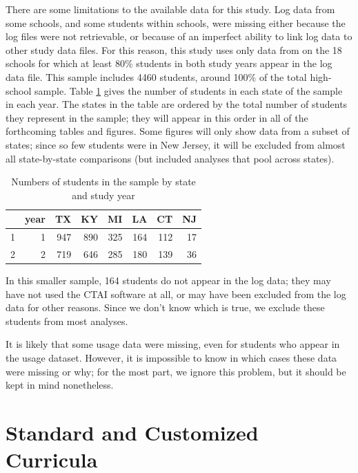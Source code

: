 \documentclass[12pt]{article}\usepackage[]{graphicx}\usepackage[]{color}
\begin{document}
There are some limitations to the available data for this study.
Log data from some schools, and some students within schools, were
missing either because the log files were not retrievable, or because
of an imperfect ability to link log data to other study data files.
For this reason, this study uses only data from on the
18 schools for which at least 80\%
students in both study years appear in the log data file.
This sample includes 4460 students, around
100\%
of the total high-school sample.
Table \ref{tab:nByState} gives the number of students in each state of
the sample in each year.
The states in the table are ordered by the total number of students
they represent in the sample; they will appear in this order in
all of the forthcoming tables and figures.
Some figures will only show data from a subset of states; since so few
students were in New Jersey, it will be excluded from almost all
state-by-state comparisons (but included analyses that pool across states).
\begin{table}[ht]
\centering
\begin{tabular}{rrrrrrrr}
  \hline
 & year & TX & KY & MI & LA & CT & NJ \\ 
  \hline
1 &   1 & 947 & 890 & 325 & 164 & 112 &  17 \\ 
  2 &   2 & 719 & 646 & 285 & 180 & 139 &  36 \\ 
   \hline
\end{tabular}
\caption{Numbers of students in the sample by state and study year} 
\label{tab:nByState}
\end{table}


In this smaller sample, 164
students do not appear in the log data; they may have not used the CTAI
software at all, or may have been excluded from the log data for other
reasons.
Since we don't know which is true, we exclude these students from most
analyses.

It is likely that some usage data were missing, even for students who
appear in the usage dataset.
However, it is impossible to know in which cases these data were
missing or why; for the most part, we ignore this problem, but it
should be kept in mind nonetheless.

\section{Standard and Customized Curricula}\label{sec:curricula}
\end{document}
